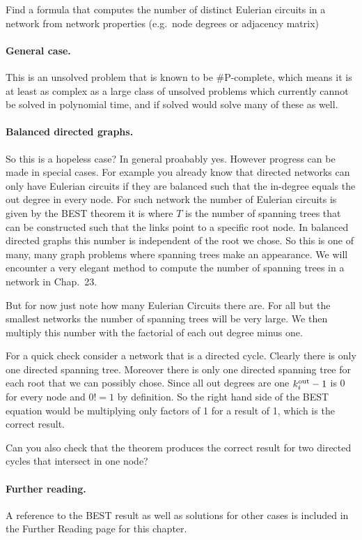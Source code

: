 
Find a formula that computes the number of distinct Eulerian circuits in a network from network properties (e.g.~node degrees or adjacency matrix) 

\solution
\paragraph{General case.} This is an unsolved problem that is known to be \#P-complete, which means it is at least as complex as a large class of unsolved problems which currently cannot be solved in polynomial time, and if solved would solve many of these as well.

\paragraph{Balanced directed graphs.} So this is a hopeless case? In general proabably yes. However progress can be made in special cases. For example you already know that directed networks can only have Eulerian circuits if they are balanced such that the in-degree equals the out degree in every node. For such network the number of Eulerian circuits is given by the BEST theorem it is 
where $T$ is the number of spanning trees that can be constructed such that the links point to a specific root node. In balanced directed graphs this number is independent of the root we chose. So this is one of many, many graph problems where spanning trees make an appearance. We will encounter a very elegant method to compute the number of spanning trees in a network in Chap.~23. 

But for now just note how many Eulerian Circuits there are. For all but the smallest networks the number of spanning trees will be very large.
We then multiply this number with the factorial of each out degree minus one. 

For a quick check consider a network that is a directed cycle. Clearly there is only one directed spanning tree. Moreover there is only one directed spanning tree for each root that we can possibly chose. Since all out degrees are one $k^{\rm out}_i-1$ is 0 for every node and $0!=1$ by definition. So the right hand side of the BEST equation would be multiplying only factors of 1 for a result of 1, which is the correct result. 

Can you also check that the theorem produces the correct result for two directed cycles that intersect in one node?

\paragraph{Further reading.}
A reference to the BEST result as well as solutions for other cases is included in the Further Reading page for this chapter.

\solutionend